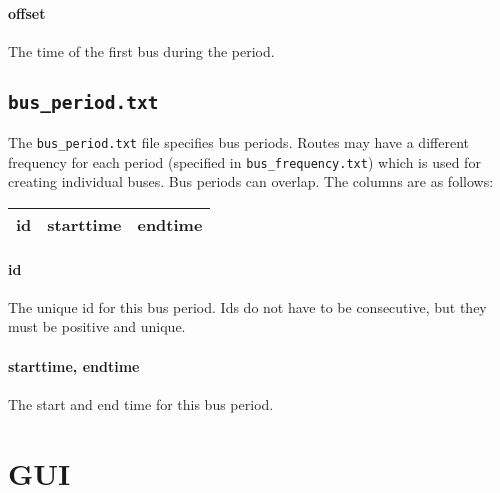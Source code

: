\paragraph*{offset} The time of the first bus during the period.


\subsection{\texttt{bus\_period.txt}}
The \texttt{bus\_period.txt} file specifies bus periods. Routes may have a different frequency for each period (specified in \texttt{bus\_frequency.txt}) which is used for creating individual buses. Bus periods can overlap. The columns are as follows:
\begin{center}
\begin{tabular}{ccc}
\hline
id & starttime & endtime\\\hline
\end{tabular}
\end{center}
\paragraph*{id} The unique id for this bus period. Ids do not have to be consecutive, but they must be positive and unique.
\paragraph*{starttime, endtime} The start and end time for this bus period.

\section{GUI}
